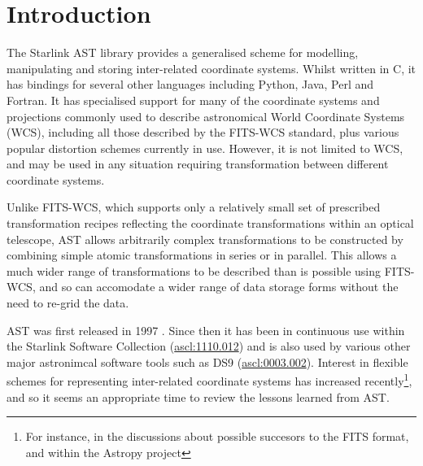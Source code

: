 \documentclass[final,authoryear,5p,times,twocolumn]{elsarticle}
\begin{document}

\newcommand{\mnras}{Mon Not R Astron Soc}
\newcommand{\aap}{Astron Astrophys}
\newcommand{\aaps}{Astron Astrophys Supp}
\newcommand{\pasp}{Pub Astron Soc Pacific}
\newcommand{\apj}{Astrophys J}
\newcommand{\apjs}{Astrophys J Supp}
\newcommand{\qjras}{Quart J R Astron Soc}
\newcommand{\an}{Astron.\ Nach.}
\newcommand{\ijimw}{Int.\ J.\ Infrared \& Millimeter Waves}
\newcommand{\procspie}{Proc.\ SPIE}
\newcommand{\aspconf}{ASP Conf. Ser.}

\newcommand{\ascl}[1]{\href{http://www.ascl.net/#1}{ascl:#1}}

\section{Introduction}
\label{sec:intro}

The Starlink AST library \citep[][\ascl{1404.016}]{SUN211} provides a
generalised scheme for modelling, manipulating and storing inter-related
coordinate systems. Whilst written in C, it has bindings for several
other languages including Python, Java, Perl and Fortran. It has
specialised support for many of the coordinate systems and projections
commonly used to describe astronomical World Coordinate Systems (WCS),
including all those described by the FITS-WCS standard, plus various
popular distortion schemes currently in use. However, it is not limited
to WCS, and may be used in any situation requiring transformation between
different coordinate systems.

Unlike FITS-WCS, which supports only a relatively small set of prescribed
transformation recipes reflecting the coordinate transformations within
an optical telescope, AST allows arbitrarily complex transformations to be
constructed by combining simple atomic transformations in series or in
parallel. This allows a much wider range of transformations to be
described than is possible using FITS-WCS, and so can accomodate a wider
range of data storage forms without the need to re-grid the data.

AST was first released in 1997 \cite[][included in ``Twenty Years of
ADASS'' \nocite{adass20}]{1998ASPC..145...41W}. Since then it has been in
continuous use within the Starlink Software Collection (\ascl{1110.012})
and is also used by various other major astronimcal software tools such as
DS9 (\ascl{0003.002}). Interest in flexible schemes for representing
inter-related coordinate systems has increased recently\footnote{For
instance, in the discussions about possible succesors to the FITS format,
and within the Astropy project}, and so it seems an appropriate time to
review the lessons learned from AST.
\end{document}
